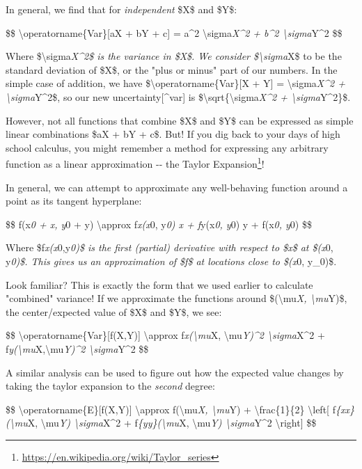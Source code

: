 \documentclass[]{article}
\renewcommand{\href}[2]{#2\footnote{\url{#1}}}
\begin{document}
In general, we find that for \emph{independent} \$X\$ and \$Y\$:

\$\$ \textbackslash{}operatorname\{Var\}{[}aX + bY + c{]} = a\^{}2
\textbackslash{}sigma\emph{X\^{}2 + b\^{}2 \textbackslash{}sigma}Y\^{}2 \$\$

Where \$\textbackslash{}sigma\emph{X\^{}2\$ is the variance in \$X\$. We
consider \$\textbackslash{}sigma}X\$ to be the standard deviation of \$X\$, or
the "plus or minus" part of our numbers. In the simple case of addition, we have
\$\textbackslash{}operatorname\{Var\}{[}X + Y{]} =
\textbackslash{}sigma\emph{X\^{}2 + \textbackslash{}sigma}Y\^{}2\$, so our new
uncertainty{[}\^{}var{]} is
\$\textbackslash{}sqrt\{\textbackslash{}sigma\emph{X\^{}2 +
\textbackslash{}sigma}Y\^{}2\}\$.

However, not all functions that combine \$X\$ and \$Y\$ can be expressed as
simple linear combinations \$aX + bY + c\$. But! If you dig back to your days of
high school calculus, you might remember a method for expressing any arbitrary
function as a linear approximation -\/- the
\href{https://en.wikipedia.org/wiki/Taylor_series}{Taylor Expansion}!

In general, we can attempt to approximate any well-behaving function around a
point as its tangent hyperplane:

\$\$ f(x\emph{0 + x, y}0 + y) \textbackslash{}approx f\emph{x(x}0, y\emph{0) x +
f}y(x\emph{0, y}0) y + f(x\emph{0, y}0) \$\$

Where \$f\emph{x(x}0,y\emph{0)\$ is the first (partial) derivative with respect
to \$x\$ at \$(x}0, y\emph{0)\$. This gives us an approximation of \$f\$ at
locations close to \$(x}0, y\_0)\$.

Look familiar? This is exactly the form that we used earlier to calculate
"combined" variance! If we approximate the functions around
\$(\textbackslash{}mu\emph{X, \textbackslash{}mu}Y)\$, the center/expected value
of \$X\$ and \$Y\$, we see:

\$\$ \textbackslash{}operatorname\{Var\}{[}f(X,Y){]} \textbackslash{}approx
f\emph{x(\textbackslash{}mu}X, \textbackslash{}mu\emph{Y)\^{}2
\textbackslash{}sigma}X\^{}2 +
f\emph{y(\textbackslash{}mu}X,\textbackslash{}mu\emph{Y)\^{}2
\textbackslash{}sigma}Y\^{}2 \$\$

A similar analysis can be used to figure out how the expected value changes by
taking the taylor expansion to the \emph{second} degree:

\$\$ \textbackslash{}operatorname\{E\}{[}f(X,Y){]} \textbackslash{}approx
f(\textbackslash{}mu\emph{X, \textbackslash{}mu}Y) +
\textbackslash{}frac\{1\}\{2\} \textbackslash{}left{[}
f\emph{\{xx\}(\textbackslash{}mu}X, \textbackslash{}mu\emph{Y)
\textbackslash{}sigma}X\^{}2 + f\emph{\{yy\}(\textbackslash{}mu}X,
\textbackslash{}mu\emph{Y) \textbackslash{}sigma}Y\^{}2 \textbackslash{}right{]}
\$\$
\end{document}

